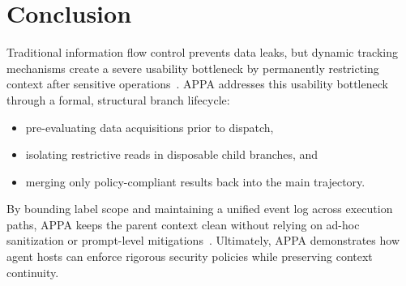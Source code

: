 \section{Conclusion}\label{sec:conclusion}

Traditional information flow control prevents data leaks, but dynamic tracking mechanisms create a severe usability bottleneck by permanently restricting context after sensitive operations~\cite{fides}. APPA addresses this usability bottleneck through a formal, structural branch lifecycle:
\begin{itemize}
  \item pre-evaluating data acquisitions prior to dispatch,
  \item isolating restrictive reads in disposable child branches, and
  \item merging only policy-compliant results back into the main trajectory.
\end{itemize}
By bounding label scope and maintaining a unified event log across execution paths, APPA keeps the parent context clean without relying on ad-hoc sanitization or prompt-level mitigations~\cite{camel2025,willison2023dual}. Ultimately, APPA demonstrates how agent hosts can enforce rigorous security policies while preserving context continuity.


